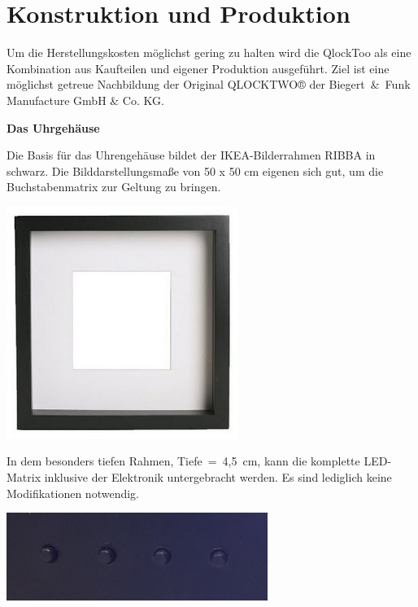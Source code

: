 
\section{Konstruktion und Produktion}
\label{sec:KonstruktionFertigung}

\begin{multicols}{2}
Um die Herstellungskosten möglichst gering zu halten wird die QlockToo als eine Kombination aus Kaufteilen und eigener Produktion ausgeführt. Ziel ist eine möglichst getreue Nachbildung der Original QLOCKTWO® der Biegert~\&~Funk Manufacture GmbH \& Co. KG.

\textbf{Das Uhrgehäuse}

Die Basis für das Uhrengehäuse bildet der IKEA-Bilderrahmen RIBBA in schwarz. Die Bilddarstellungsmaße von 50 x 50 cm eigenen sich gut, um die Buchstabenmatrix zur Geltung zu bringen.

{
\centering
\includegraphics[width=0.75\columnwidth]{Abbildungen/Konstruktion/Ribba02} %

}
In dem besonders tiefen Rahmen,  Tiefe~=~4,5~cm, kann die komplette LED-Matrix inklusive der Elektronik untergebracht werden. Es sind lediglich keine Modifikationen notwendig.

{
\centering
\includegraphics[width=0.5\columnwidth]{Abbildungen/Konstruktion/Taster03}

}
\end{multicols}
